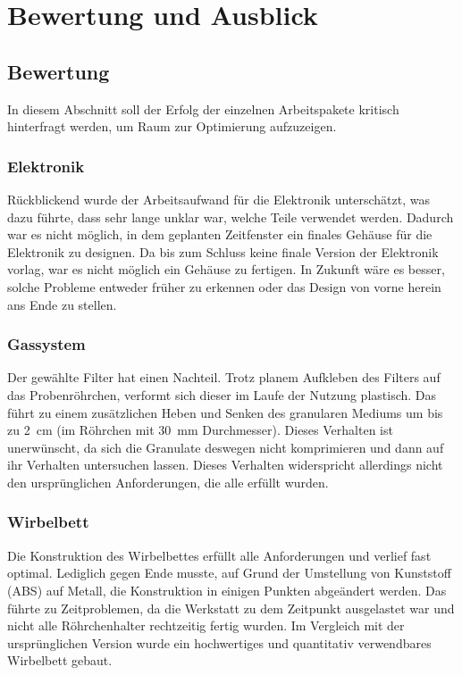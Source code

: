 \chapter{Bewertung und Ausblick}


\section{Bewertung}

In diesem Abschnitt soll der Erfolg der einzelnen Arbeitspakete kritisch hinterfragt werden, um Raum zur Optimierung aufzuzeigen. 

\subsection{Elektronik}

Rückblickend wurde der Arbeitsaufwand für die Elektronik unterschätzt, was dazu führte, dass sehr lange unklar war, welche Teile verwendet werden. Dadurch war es nicht möglich, in dem geplanten Zeitfenster ein finales Gehäuse für die Elektronik zu designen. Da bis zum Schluss keine finale Version der Elektronik vorlag, war es nicht möglich ein Gehäuse zu fertigen. In Zukunft wäre es besser, solche Probleme entweder früher zu erkennen oder das Design von vorne herein ans Ende zu stellen. 

\subsection{Gassystem}

Der gewählte Filter hat einen Nachteil. Trotz planem Aufkleben des Filters auf das Probenröhrchen, verformt sich dieser im Laufe der Nutzung plastisch. Das führt zu einem zusätzlichen Heben und Senken des granularen Mediums um bis zu \SI{2}{cm} (im Röhrchen mit \SI{30}{mm}  Durchmesser). Dieses Verhalten ist unerwünscht, da sich die Granulate deswegen nicht komprimieren und dann auf ihr Verhalten untersuchen lassen. Dieses Verhalten widerspricht allerdings nicht den ursprünglichen Anforderungen, die alle erfüllt wurden.

\subsection{Wirbelbett}

Die Konstruktion des Wirbelbettes erfüllt alle Anforderungen und verlief fast optimal. Lediglich gegen Ende musste, auf Grund der Umstellung von Kunststoff (ABS) auf Metall, die Konstruktion in einigen Punkten abgeändert werden. Das führte zu Zeitproblemen, da die Werkstatt zu dem Zeitpunkt ausgelastet war und nicht alle Röhrchenhalter rechtzeitig fertig wurden.
Im Vergleich mit der ursprünglichen Version wurde ein hochwertiges und quantitativ verwendbares Wirbelbett gebaut.

